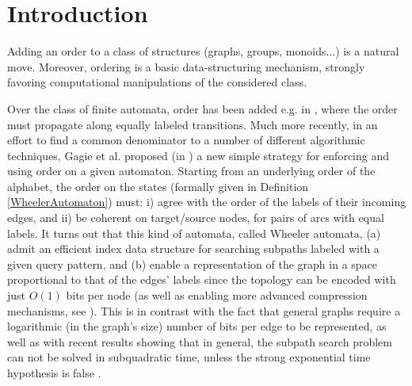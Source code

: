 \documentclass[runningheads]{llncs}
\begin{document}
\section{Introduction}
\label{intro}

Adding an order to a class of structures (graphs, groups, monoids...) is a natural move. Moreover, ordering is a basic data-structuring mechanism, strongly favoring  computational manipulations of the considered class. 

Over the class of finite automata, order has been added e.g. in \cite{ordered_aut}, where the order must propagate along equally labeled transitions. 
Much more recently, in an effort to find a common denominator to a number of different algorithmic techniques, Gagie et al.  proposed (in \cite{Gagie}) a  new simple strategy for enforcing and using  order on a given automaton. Starting from an underlying order of the alphabet, the order on the states (formally given in Definition \ref{WheelerAutomaton}) must: i) agree with the order of the labels of their incoming edges, and ii) be coherent on target/source nodes, for pairs of arcs with equal labels. 
It turns out that this kind of automata, called Wheeler automata, (a) admit an efficient index data structure for searching  subpaths labeled with a given query pattern, and (b)  enable a representation of the graph in a space proportional to that of the edges' labels since the topology can be encoded with just $O(1)$ bits
per node \cite{Gagie} (as well as enabling more advanced compression mechanisms, see \cite{alanko2019tunneling,prezza2020locating}). 
This is in contrast with the fact that general graphs require a logarithmic (in the graph's size) number of bits per edge to be represented, as well as with recent results showing that in general, the subpath search problem can not be solved in subquadratic time, unless the strong exponential time hypothesis is false \cite{backurs2016regular,equi2020complexity,equi2020graphs,gibney2020simple,potechin2018lengths}.
\end{document}
